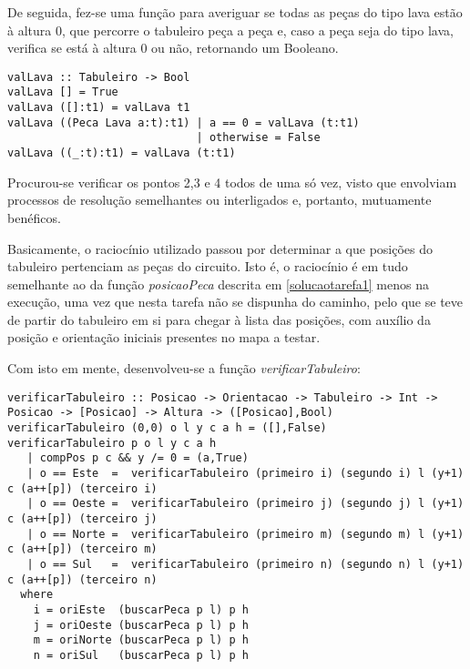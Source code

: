 \documentclass[a4paper]{report}
\begin{document}
De seguida, fez-se uma função para averiguar se todas as peças do tipo lava estão à altura 0, que percorre o tabuleiro peça a peça e, caso a peça seja do tipo lava, verifica se está à altura 0 ou não, retornando um Booleano.

\begin{verbatim}
valLava :: Tabuleiro -> Bool
valLava [] = True
valLava ([]:t1) = valLava t1
valLava ((Peca Lava a:t):t1) | a == 0 = valLava (t:t1)
                             | otherwise = False
valLava ((_:t):t1) = valLava (t:t1)
\end{verbatim}

Procurou-se verificar os pontos 2,3 e 4 todos de uma só vez, visto que envolviam processos de resolução semelhantes ou interligados e, portanto, mutuamente benéficos.

Basicamente, o raciocínio utilizado passou por determinar a que posições do tabuleiro pertenciam as peças do circuito. Isto é, o raciocínio é em tudo semelhante ao da função \textit{posicaoPeca} descrita em \ref{solucaotarefa1} menos na execução, uma vez que nesta tarefa não se dispunha do caminho, pelo que se teve de partir do tabuleiro em si para chegar à lista das posições, com auxílio da posição e orientação iniciais presentes no mapa a testar.

Com isto em mente, desenvolveu-se a função \textit{verificarTabuleiro}: 

\begin{lstlisting}
verificarTabuleiro :: Posicao -> Orientacao -> Tabuleiro -> Int -> Posicao -> [Posicao] -> Altura -> ([Posicao],Bool) 
verificarTabuleiro (0,0) o l y c a h = ([],False)
verificarTabuleiro p o l y c a h 
   | compPos p c && y /= 0 = (a,True)                       
   | o == Este  =  verificarTabuleiro (primeiro i) (segundo i) l (y+1) c (a++[p]) (terceiro i)                          
   | o == Oeste =  verificarTabuleiro (primeiro j) (segundo j) l (y+1) c (a++[p]) (terceiro j)                          
   | o == Norte =  verificarTabuleiro (primeiro m) (segundo m) l (y+1) c (a++[p]) (terceiro m)                          
   | o == Sul   =  verificarTabuleiro (primeiro n) (segundo n) l (y+1) c (a++[p]) (terceiro n)
  where
    i = oriEste  (buscarPeca p l) p h
    j = oriOeste (buscarPeca p l) p h
    m = oriNorte (buscarPeca p l) p h
    n = oriSul   (buscarPeca p l) p h
\end{lstlisting}
\end{document}

